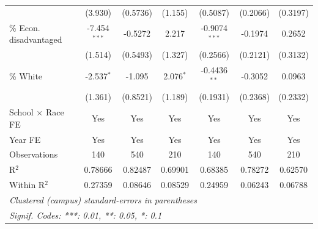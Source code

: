 \documentclass[hidelinks,twoside]{article}
\begin{document}
\begin{table}
\begin{tabular}{lcccccc}
                                            & (3.930)        & (0.5736)       & (1.155)      & (0.5087)        & (0.2066)       & (0.3197)\\   
   \% Econ. disadvantaged                         & -7.454$^{***}$ & -0.5272        & 2.217        & -0.9074$^{***}$ & -0.1974        & 0.2652\\   
                                            & (1.514)        & (0.5493)       & (1.327)      & (0.2566)        & (0.2121)       & (0.3132)\\   
   \% White                           & -2.537$^{*}$   & -1.095         & 2.076$^{*}$  & -0.4436$^{**}$  & -0.3052        & 0.0963\\   
                                            & (1.361)        & (0.8521)       & (1.189)      & (0.1931)        & (0.2368)       & (0.2332)\\   
   \midrule
   School $\times$ Race FE                                   & Yes            & Yes            & Yes          & Yes             & Yes            & Yes\\  
   Year FE                                     & Yes            & Yes            & Yes          & Yes             & Yes            & Yes\\  
   Observations                             & 140            & 540            & 210          & 140             & 540            & 210\\  
   R$^2$                                    & 0.78666        & 0.82487        & 0.69901      & 0.68385         & 0.78272        & 0.62570\\  
   Within R$^2$                             & 0.27359        & 0.08646        & 0.08529      & 0.24959         & 0.06243        & 0.06788\\  
   \midrule \midrule
   \multicolumn{7}{l}{\emph{Clustered (campus) standard-errors in parentheses}}\\
   \multicolumn{7}{l}{\emph{Signif. Codes: ***: 0.01, **: 0.05, *: 0.1}}\\
\end{tabular}
\label{tab:eventstudy_math}
\end{table}
\end{document}
